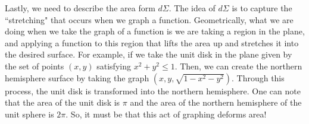                                       Lastly, we need to describe the area form $d\Sigma$.  The idea of $d\Sigma$ is to capture the ``stretching" that occurs when we graph a function.  Geometrically, what we are doing when we take the graph of a function is we are taking a region in the plane, and applying a function to this region that lifts the area up and stretches it into the desired surface.  For example, if we take the unit disk in the plane given by the set of points $(x,y)$ satisfying $x^2+y^2\leq 1$.  Then, we can create the northern hemisphere surface by taking the graph $(x,y,\sqrt{1-x^2-y^2})$.  Through this process, the unit disk is transformed into the northern hemisphere.  One can note that the area of the unit disk is $\pi$ and the area of the northern hemisphere of the unit sphere is $2\pi$.  So, it must be that this act of graphing deforms area!

